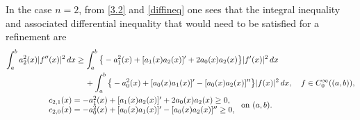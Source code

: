 \documentclass[reqno,10pt,centertags]{amsart}
\numberwithin{equation}{section}
\theoremstyle{remark}
\begin{document}
In the case $n=2$, from \eqref{3.2} and \eqref{diffineq} one sees that the integral inequality and associated differential inequality that would need to be satisfied for a refinement are
\begin{align}\label{5.18}
\int_a^b a_2^2(x) |f''(x)|^2\,  dx &\geq \int_a^b \big\{-a_1^2(x)+[a_1(x)a_2(x)]'+2a_0(x)a_2(x)\big\}|f'(x)|^2\, dx  \notag \\
&\quad\, + \int_a^b \big\{-a_0^2(x)+[a_0(x)a_1(x)]'-[a_0(x)a_2(x)]''\big\}|f(x)|^2\, dx,\quad f\in C^\infty_0((a,b)), \notag \\
&\hspace{-1.7cm}\begin{array}{cl}
&c_{2,1}(x)=-a_1^2(x)+[a_1(x)a_2(x)]'+2a_0(x)a_2(x)\geq0,\\
&c_{2,0}(x)=-a_0^2(x)+[a_0(x)a_1(x)]'-[a_0(x)a_2(x)]''\geq0,
\end{array}
\ \text{on}\ (a,b).
\end{align}
\end{document}

